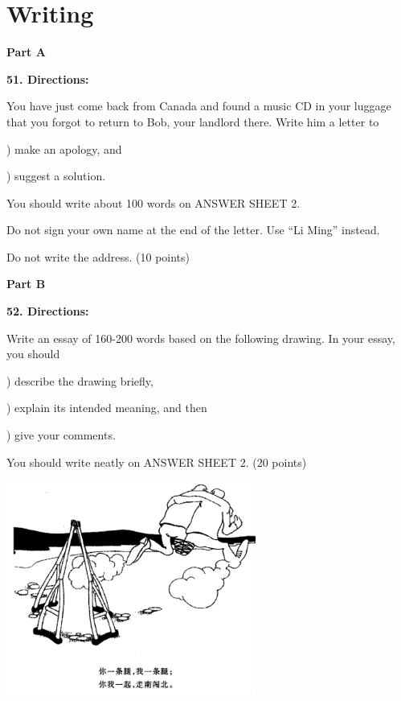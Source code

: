 
\section{Writing}

\textbf{Part A}

\textbf{51. Directions:}

\qquad You have just come back from Canada and found a music CD in your luggage that you forgot to return to Bob, your landlord there. Write him a letter to

) make an apology, and

) suggest a solution.

\qquad You should write about 100 words on ANSWER SHEET 2.

\qquad Do not sign your own name at the end of the letter. Use ``Li Ming'' instead.

\qquad Do not write the address. (10 points)

\vspace{10pt}

\textbf{Part B}

\textbf{52. Directions:}

\qquad Write an essay of 160-200 words based on the following drawing. In your essay, you should

) describe the drawing briefly,

) explain its intended meaning, and then

) give your comments.

\qquad You should write neatly on ANSWER SHEET 2. (20 points)

\begin{center}\includegraphics[height=7cm]{8.png}\end{center}